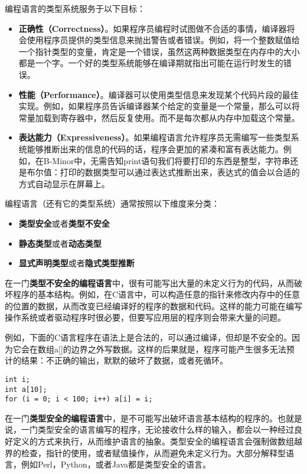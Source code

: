 \documentclass[cn,11pt,chinese]{elegantbook}
\begin{document}
编程语言的类型系统服务于以下目标：

\begin{itemize}
  \item \textbf{正确性（Correctness）}。如果程序员编程时试图做不合适的事情，编译器将会使用程序员提供的类型信息来抛出警告或者错误。例如，将一个整数赋值给一个指针类型的变量，肯定是一个错误，虽然这两种数据类型在内存中的大小都是一个字。一个好的类型系统能够在编译期就指出可能在运行时发生的错误。
  \item \textbf{性能（Performance）}。编译器可以使用类型信息来发现某个代码片段的最佳实现。例如，如果程序员告诉编译器某个给定的变量是一个常量，那么可以将常量加载到寄存器中，然后反复使用。而不是每次都从内存中加载这个常量。
  \item \textbf{表达能力（Expressiveness）}。如果编程语言允许程序员无需编写一些类型系统能够推断出来的信息的代码的话，程序会更加的紧凑和富有表达能力。例如，在B-Minor中，无需告知print语句我们将要打印的东西是整型，字符串还是布尔值：打印的数据类型可以通过表达式推断出来，表达式的值会以合适的方式自动显示在屏幕上。
\end{itemize}

编程语言（还有它的类型系统）通常按照以下维度来分类：

\begin{itemize}
  \item \textbf{类型安全}或者\textbf{类型不安全}
  \item \textbf{静态类型}或者\textbf{动态类型}
  \item \textbf{显式声明类型}或者\textbf{隐式类型推断}
\end{itemize}

在一门\textbf{类型不安全的编程语言}中，很有可能写出大量的未定义行为的代码，从而破坏程序的基本结构。例如，在C语言中，可以构造任意的指针来修改内存中的任意的位置的数据，从而改变已经编译好的程序的数据和代码。这样的能力可能在编写操作系统或者驱动程序时很必要，但要写应用层的程序则会带来大量的问题。

例如，下面的C语言程序在语法上是合法的，可以通过编译，但却是不安全的。因为它会在数组a[]的边界之外写数据。这样的后果就是，程序可能产生很多无法预计的结果：不正确的输出，默默的破坏了数据，或者死循环。

\begin{verbatim}
int i;
int a[10];
for (i = 0; i < 100; i++) a[i] = i;
\end{verbatim}

在一门\textbf{类型安全的编程语言}中，是不可能写出破坏语言基本结构的程序的。也就是说，一门类型安全的语言编写的程序，无论接收什么样的输入，都会以一种经过良好定义的方式来执行，从而维护语言的抽象。类型安全的编程语言会强制做数组越界的检查，指针的使用，或者赋值操作，从而避免未定义行为。大部分解释型语言，例如Perl，Python，或者Java都是类型安全的语言。
\end{document}
